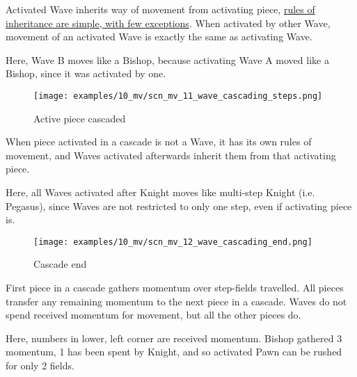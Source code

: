 Activated Wave inherits way of movement from activating piece,
\hyperref[sec:Appendix/Movement of Wave]{rules of inheritance are simple, with few exceptions}.
When activated by other Wave, movement of an activated Wave is exactly the same as
activating Wave.

Here, Wave B moves like a Bishop, because activating Wave A moved like a Bishop,
since it was activated by one.

\clearpage %

\vspace*{-5.0ex}
\noindent
\begin{figure}[h]
\texttt{[image: examples/10\_mv/scn\_mv\_11\_wave\_cascading\_steps.png]}
\caption{Active piece cascaded}
\label{fig:scn_mv_11_wave_cascading_steps}
\end{figure}

When piece activated in a cascade is not a Wave, it has its own rules of movement, and
Waves activated afterwards inherit them from that activating piece.

Here, all Waves activated after Knight moves like multi-step Knight (i.e. Pegasus),
since Waves are not restricted to only one step, even if activating piece is.

\clearpage %

\vspace*{-5.0ex}
\noindent
\begin{figure}[h]
\texttt{[image: examples/10\_mv/scn\_mv\_12\_wave\_cascading\_end.png]}
\caption{Cascade end}
\label{fig:scn_mv_12_wave_cascading_end}
\end{figure}

First piece in a cascade gathers momentum over step-fields travelled. All pieces
transfer any remaining momentum to the next piece in a cascade. Waves do not spend
received momentum for movement, but all the other pieces do.

Here, numbers in lower, left corner are received momentum. Bishop gathered 3 momentum,
1 has been spent by Knight, and so activated Pawn can be rushed for only 2 fields.



